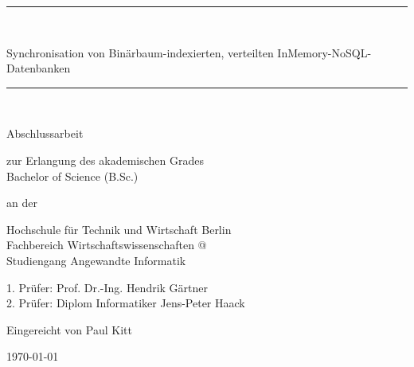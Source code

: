 \documentclass[a4paper,11pt,oneside,%
headsepline,												%
footsepline,												%
bibtotocnumbered									%
]{scrreprt}
\makeatletter
\newcommand*{\rom}[1]{\expandafter\@slowromancap\romannumeral #1@}
\newcommand{\HRule}{\rule{\linewidth}{0.5mm}}
\makeatother
\begin{document}
\begin{titlepage}
\begin{center}
		 \vfill
		 \HRule \\[0.4cm]
	    {\bfseries\Large
	        \begin{LARGE}
	        Synchronisation von Binärbaum-indexierten, verteilten
			InMemory-NoSQL-Datenbanken\\
	        \end{LARGE} 
	    }    
		\HRule \\[1.5cm]
			\begin{minipage}{1.0\textwidth}
				\begin{flushleft}
				\Large	Abschlussarbeit
				\end{flushleft}
			\end{minipage}
			\vfill
			\begin{minipage}{1.0\textwidth}
				\begin{flushleft}
					\Large zur Erlangung des akademischen Grades\\
					\Large Bachelor of Science (B.Sc.)
				\end{flushleft}
			\end{minipage}
			\vfill
			\begin{minipage}{1.0\textwidth}
				\begin{flushleft}
					\Large an der
				\end{flushleft}
			\end{minipage}
			\vfill
			\begin{minipage}{1.0\textwidth}
				\begin{flushleft}
					\Large Hochschule für Technik und Wirtschaft Berlin\\
					\Large Fachbereich Wirtschaftswissenschaften \rom{2}\\
					\Large Studiengang Angewandte Informatik\\
				\end{flushleft}
			\end{minipage}
			\vfill
			\begin{minipage}{1.0\textwidth}
				\begin{flushleft}
					\Large 1. Prüfer: Prof. Dr.-Ing. Hendrik Gärtner\\
					\Large 2. Prüfer: Diplom Informatiker Jens-Peter Haack\\ 
				\end{flushleft}
			\end{minipage}
			\vfill
			\begin{minipage}{1.0\textwidth}
				\begin{flushleft}
					\Large Eingereicht von Paul Kitt
				\end{flushleft}
			\end{minipage}

		\vfill
		\begin{minipage}{1.0\textwidth}
			\begin{flushleft}
				{\Large \today}
			\end{flushleft}
		\end{minipage}
		\vfill

	\end{center}
\end{titlepage}
\tableofcontents
\end{document}
